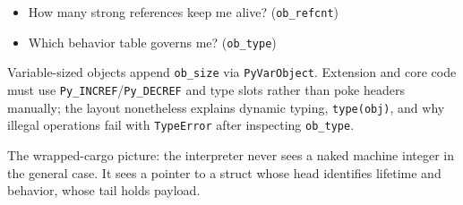\begin{itemize}
    \item How many strong references keep me alive? (\texttt{ob\_refcnt})
    \item Which behavior table governs me? (\texttt{ob\_type})
\end{itemize}

Variable-sized objects append \texttt{ob\_size} via \texttt{PyVarObject}. Extension and core code must use \texttt{Py\_INCREF}/\texttt{Py\_DECREF} and type slots rather than poke headers manually; the layout nonetheless explains dynamic typing, \texttt{type(obj)}, and why illegal operations fail with \texttt{TypeError} after inspecting \texttt{ob\_type}.

The wrapped-cargo picture: the interpreter never sees a naked machine integer in the general case. It sees a pointer to a struct whose head identifies lifetime and behavior, whose tail holds payload.
